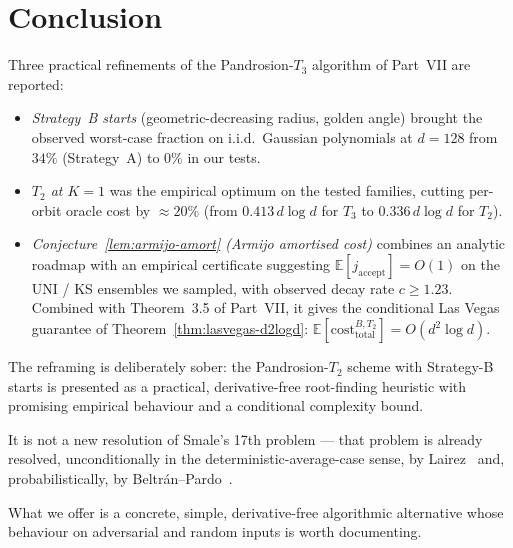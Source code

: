 \documentclass[11pt,a4paper]{article}
\begin{document}
\section{Conclusion}

Three practical refinements of the Pandrosion-$T_3$ algorithm of Part~VII are reported:
\begin{itemize}
\item \emph{Strategy~B starts} (geometric-decreasing radius, golden angle) brought the observed worst-case fraction on i.i.d.\ Gaussian polynomials at $d = 128$ from $34\%$ (Strategy~A) to $0\%$ in our tests.
\item \emph{$T_2$ at $K = 1$} was the empirical optimum on the tested families, cutting per-orbit oracle cost by $\approx 20\%$ (from $0.413\, d \log d$ for $T_3$ to $0.336\, d \log d$ for $T_2$).
\item \emph{Conjecture~\ref{lem:armijo-amort} (Armijo amortised cost)} combines an analytic roadmap with an empirical certificate suggesting $\mathbb{E}[j_{\text{accept}}] = O(1)$ on the UNI / KS ensembles we sampled, with observed decay rate $c \ge 1.23$. Combined with Theorem~3.5 of Part~VII, it gives the conditional Las Vegas guarantee of Theorem~\ref{thm:lasvegas-d2logd}: $\mathbb{E}[\mathrm{cost}^{B, T_2}_{\text{total}}] = O(d^2 \log d)$.
\end{itemize}

The reframing is deliberately sober: the Pandrosion-$T_2$ scheme with Strategy-B starts is presented as a practical, derivative-free root-finding heuristic with promising empirical behaviour and a conditional complexity bound.

It is not a new resolution of Smale's 17th problem --- that problem is already resolved, unconditionally in the deterministic-average-case sense, by Lairez~\cite{lairez} and, probabilistically, by Beltr\'an--Pardo~\cite{beltranpardo}.

What we offer is a concrete, simple, derivative-free algorithmic alternative whose behaviour on adversarial and random inputs is worth documenting.
\end{document}
